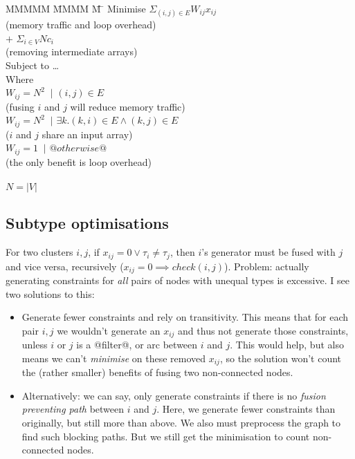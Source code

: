 \begin{tabbing}
MMMMM   \= MMMM \= M \= \kill
Minimise   \>     \> $\Sigma_{(i,j) \in E} W_{ij} x_{ij}$   \\
           \> \> \> (memory traffic and loop overhead)         \\
           \> $+$ \> $\Sigma_{i \in V} N c_i$  \\
           \> \> \> (removing intermediate arrays)         \\
Subject to \> \ldots                                \\
Where      \>                                       \\
           \> $W_{ij} = N^2$ \> $~|$ \> $(i,j) \in E $         \\
           \> \> \> (fusing $i$ and $j$ will reduce memory traffic)         \\
           \> $W_{ij} = N^2$ \> $~|$ \> $\exists k. (k,i) \in E \wedge (k,j) \in E $     \\
           \> \> \> ($i$ and $j$ share an input array)                                         \\
           \> $W_{ij} = 1$   \> $~|$ \> $@otherwise@$                                                  \\
           \> \> \> (the only benefit is loop overhead)                                        \\
           \\
           \> $N = |V|$
\end{tabbing}



\subsection{Subtype optimisations}
For two clusters $i, j$, if $x_{ij} = 0 \vee \tau_i \not= \tau_j$, then $i$'s generator must be fused with $j$ and vice versa, recursively ($x_{ij} = 0 \implies check(i,j)$).
Problem: actually generating constraints for \emph{all} pairs of nodes with unequal types is excessive.
I see two solutions to this:
\begin{itemize}
\item
Generate fewer constraints and rely on transitivity.
This means that for each pair $i,j$ we wouldn't generate an $x_{ij}$ and thus not generate those constraints, unless $i$ or $j$ is a @filter@, or arc between $i$ and $j$.
This would help, but also means we can't \emph{minimise} on these removed $x_{ij}$, so the solution won't count the (rather smaller) benefits of fusing two non-connected nodes.
\item
Alternatively:
we can say, only generate constraints if there is no \emph{fusion preventing path} between $i$ and $j$.
Here, we generate fewer constraints than originally, but still more than above.
We also must preprocess the graph to find such blocking paths.
But we still get the minimisation to count non-connected nodes.
\end{itemize}

